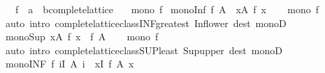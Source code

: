 \begin{isabellebody}
\isamarkupfalse%
\isanewline
\ \ \ f\ {\isacharcolon}{\kern0pt}{\isacharcolon}{\kern0pt}\ {\isachardoublequoteopen}{\isacharprime}{\kern0pt}a\ {\isasymRightarrow}\ {\isacharprime}{\kern0pt}b{\isacharcolon}{\kern0pt}{\isacharcolon}{\kern0pt}complete{\isacharunderscore}{\kern0pt}lattice{\isachardoublequoteclose}\isanewline
\ \ \ {\isachardoublequoteopen}mono\ f{\isachardoublequoteclose}\isanewline
{}\isanewline
\isanewline
{}\isamarkupfalse%
\ mono{\isacharunderscore}{\kern0pt}Inf{\isacharcolon}{\kern0pt}\ {\isachardoublequoteopen}f\ {\isacharparenleft}{\kern0pt}{\isasymSqinter}A{\isacharparenright}{\kern0pt}\ {\isasymle}\ {\isacharparenleft}{\kern0pt}{\isasymSqinter}x{\isasymin}A{\isachardot}{\kern0pt}\ f\ x{\isacharparenright}{\kern0pt}{\isachardoublequoteclose}\isanewline
%
\isadelimproof
\ \ %
\endisadelimproof
%
\isatagproof
{}\isamarkupfalse%
\ {\isacartoucheopen}mono\ f{\isacartoucheclose}\ \isamarkupfalse%
\ {\isacharparenleft}{\kern0pt}auto\ intro{\isacharcolon}{\kern0pt}\ complete{\isacharunderscore}{\kern0pt}lattice{\isacharunderscore}{\kern0pt}class{\isachardot}{\kern0pt}INF{\isacharunderscore}{\kern0pt}greatest\ Inf{\isacharunderscore}{\kern0pt}lower\ dest{\isacharcolon}{\kern0pt}\ monoD{\isacharparenright}{\kern0pt}%
\endisatagproof
{\isafoldproof}%
%
\isadelimproof
\isanewline
%
\endisadelimproof
\isanewline
{}\isamarkupfalse%
\ mono{\isacharunderscore}{\kern0pt}Sup{\isacharcolon}{\kern0pt}\ {\isachardoublequoteopen}{\isacharparenleft}{\kern0pt}{\isasymSqunion}x{\isasymin}A{\isachardot}{\kern0pt}\ f\ x{\isacharparenright}{\kern0pt}\ {\isasymle}\ f\ {\isacharparenleft}{\kern0pt}{\isasymSqunion}A{\isacharparenright}{\kern0pt}{\isachardoublequoteclose}\isanewline
%
\isadelimproof
\ \ %
\endisadelimproof
%
\isatagproof
{}\isamarkupfalse%
\ {\isacartoucheopen}mono\ f{\isacartoucheclose}\ \isamarkupfalse%
\ {\isacharparenleft}{\kern0pt}auto\ intro{\isacharcolon}{\kern0pt}\ complete{\isacharunderscore}{\kern0pt}lattice{\isacharunderscore}{\kern0pt}class{\isachardot}{\kern0pt}SUP{\isacharunderscore}{\kern0pt}least\ Sup{\isacharunderscore}{\kern0pt}upper\ dest{\isacharcolon}{\kern0pt}\ monoD{\isacharparenright}{\kern0pt}%
\endisatagproof
{\isafoldproof}%
%
\isadelimproof
\isanewline
%
\endisadelimproof
\isanewline
{}\isamarkupfalse%
\ mono{\isacharunderscore}{\kern0pt}INF{\isacharcolon}{\kern0pt}\ {\isachardoublequoteopen}f\ {\isacharparenleft}{\kern0pt}{\isasymSqinter}i{\isasymin}I{\isachardot}{\kern0pt}\ A\ i{\isacharparenright}{\kern0pt}\ {\isasymle}\ {\isacharparenleft}{\kern0pt}{\isasymSqinter}x{\isasymin}I{\isachardot}{\kern0pt}\ f\ {\isacharparenleft}{\kern0pt}A\ x{\isacharparenright}{\kern0pt}{\isacharparenright}{\kern0pt}{\isachardoublequoteclose}\isanewline

\end{isabellebody}
